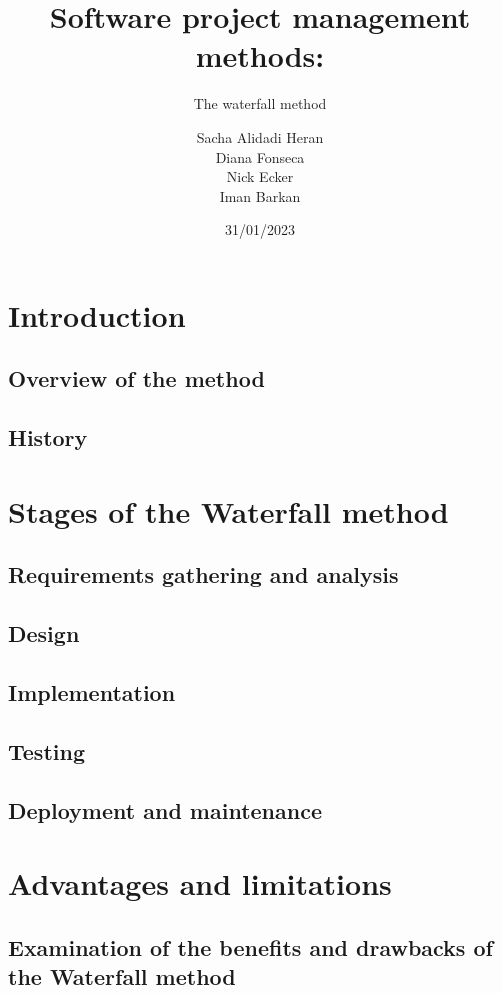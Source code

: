 \documentclass{beamer}
\title[Waterfall Method]{Software project management methods:}
\subtitle{The waterfall method}
\author[]{ Sacha Alidadi Heran \\ Diana Fonseca \\ Nick Ecker \\ Iman Barkan}
\institute[Projet, Master 1 CSMI]{}
\date{31/01/2023}
\begin{document}
\begin{frame}
\titlepage
\end{frame}


\section{Introduction}
\subsection{Overview of the method}
\subsection{History}




\section{Stages of the Waterfall method}
\subsection{Requirements gathering and analysis}
\subsection{Design}
\subsection{Implementation}
\subsection{Testing}
\subsection{Deployment and maintenance}







\section{Advantages and limitations}
\subsection{Examination of the benefits and drawbacks of the Waterfall method}


\end{document}
